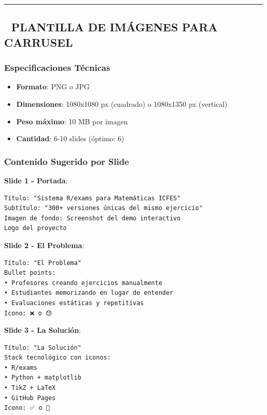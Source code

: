 \documentclass[
]{article}
\providecommand{\tightlist}{%
  \setlength{\itemsep}{0pt}\setlength{\parskip}{0pt}}
\begin{document}
\begin{center}\rule{0.5\linewidth}{0.5pt}\end{center}

\subsection{🎨 PLANTILLA DE IMÁGENES PARA
CARRUSEL}\label{plantilla-de-imuxe1genes-para-carrusel}

\subsubsection{Especificaciones
Técnicas}\label{especificaciones-tuxe9cnicas}

\begin{itemize}
\tightlist
\item
  \textbf{Formato}: PNG o JPG
\item
  \textbf{Dimensiones}: 1080x1080 px (cuadrado) o 1080x1350 px
  (vertical)
\item
  \textbf{Peso máximo}: 10 MB por imagen
\item
  \textbf{Cantidad}: 6-10 slides (óptimo: 6)
\end{itemize}

\subsubsection{Contenido Sugerido por
Slide}\label{contenido-sugerido-por-slide}

\textbf{Slide 1 - Portada}:

\begin{verbatim}
Título: "Sistema R/exams para Matemáticas ICFES"
Subtítulo: "300+ versiones únicas del mismo ejercicio"
Imagen de fondo: Screenshot del demo interactivo
Logo del proyecto
\end{verbatim}

\textbf{Slide 2 - El Problema}:

\begin{verbatim}
Título: "El Problema"
Bullet points:
• Profesores creando ejercicios manualmente
• Estudiantes memorizando en lugar de entender
• Evaluaciones estáticas y repetitivas
Icono: ❌ o 😓
\end{verbatim}

\textbf{Slide 3 - La Solución}:

\begin{verbatim}
Título: "La Solución"
Stack tecnológico con iconos:
• R/exams
• Python + matplotlib
• TikZ + LaTeX
• GitHub Pages
Icono: ✅ o 🚀
\end{verbatim}
\end{document}
